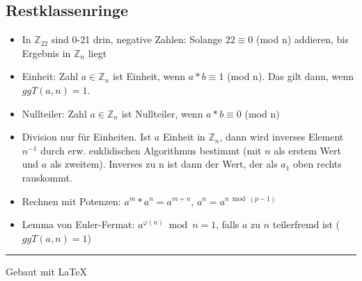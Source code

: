 \documentclass[12pt,landscape]{article}
\begin{document}
\begin{multicols}{3}
\subsection{Restklassenringe}
\begin{itemize}
\item In $\mathbb{Z}_{22}$ sind 0-21 drin, negative Zahlen: Solange $22 \equiv 0$ (mod n) addieren, bis Ergebnis in $\mathbb{Z}_{n}$ liegt
\item Einheit: Zahl $a \in \mathbb{Z}_{n}$ ist Einheit, wenn $a * b \equiv 1$ (mod n). Das gilt dann, wenn $ggT(a, n) = 1$.
\item Nullteiler: Zahl $a \in \mathbb{Z}_{n}$ ist Nullteiler, wenn $a * b \equiv 0$ (mod n)
\item Division nur für Einheiten. Ist $a$ Einheit in $\mathbb{Z}_{n}$, dann wird inverses Element $n^{-1}$ durch erw. euklidischen Algorithmus bestimmt (mit $n$ als erstem Wert und $a$ als zweitem). Inverses zu n ist dann der Wert, der als $a_1$ oben rechts rauskommt.
\item Rechnen mit Potenzen: $a^m * a^n = a^{m+n}$, $a^n=a^{n \bmod (p-1)}$ 
\item Lemma von Euler-Fermat: $a^{\varphi(n)} \bmod n = 1$, falls $a$ zu $n$ teilerfremd ist ($ggT(a, n)=1$)
\end{itemize}

\rule{0.3\linewidth}{0.25pt}
\scriptsize

Gebaut mit \LaTeX

\end{multicols}
\end{document}
